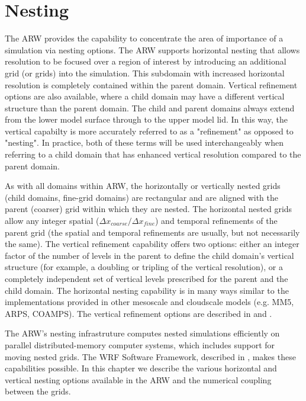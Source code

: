 \chapter{Nesting}
\label{nesting_chap}

The ARW provides the capability to concentrate the area of importance of a simulation
via nesting options. 
The ARW supports horizontal nesting that allows resolution to be
focused over a region of interest by introducing an additional grid (or
grids) into the simulation.  This subdomain with increased horizontal resolution is completely
contained within the parent domain. Vertical refinement options are also 
available, where a child domain may have a different vertical structure than
the parent domain. The child and parent domains always extend from the lower model surface
through to the upper model lid. In this way, the vertical capabilty is more accurately referred
to as a "refinement" as opposed to "nesting". In practice, both of these terms will be used 
interchangeably when referring to a child domain that has enhanced vertical resolution 
compared to the parent domain.

As with all domains within ARW, the horizontally or vertically nested grids (child domains, 
fine-grid domains) are rectangular
and are aligned with the parent (coarser) grid within which they are
nested.  
The horizontal nested grids allow any integer spatial
($\Delta x_{coarse}/\Delta x_{fine}$) 
and temporal refinements of the
parent grid (the spatial and temporal refinements are usually,
but not necessarily the same).  
The vertical refinement capability offers two options: either an integer factor of the
number of levels in the parent to define the child domain's vertical structure (for example, 
a doubling or tripling of the vertical resolution), or a completely independent set of 
vertical levels prescribed for the parent and the child domain.
The horizontal nesting capability is in many ways similar to the
implementations provided in other mesoscale and cloudscale models (e.g. MM5,
ARPS, COAMPS). The vertical refinement options are described in 
\citet{mahalovmoustaoui09} and \citet{daniels16}.

The ARW's nesting
infrastruture computes nested
simulations efficiently on parallel distributed-memory computer systems,
which includes support for moving nested grids.
The WRF Software Framework, described in
\citet{michalak04}, makes these capabilities possible.  In this chapter we
describe the various horizontal and vertical nesting options available in the ARW and the 
numerical coupling between the grids.

